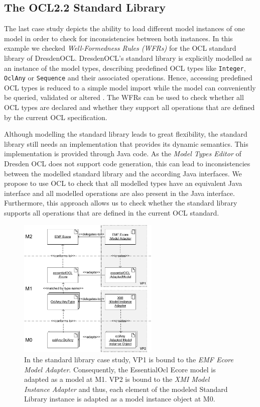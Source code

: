 \subsection{The OCL2.2 Standard Library}
The last case study depicts the ability to load different model instances of one model 
in order to check for inconsistencies between both instances. In this example we 
checked \textit{Well-Formedness Rules (WFRs)} for the OCL standard library of DresdenOCL. 
DresdenOCL's standard library is explicitly modelled as 
an instance of the model types, describing predefined OCL types like \texttt{Integer}, 
\texttt{OclAny} or \texttt{Sequence} and their associated operations. 
Hence, accessing predefined OCL types is reduced to a simple model 
import while the model can conveniently be queried, validated or altered 
\cite{braeuerOCL07}. The WFRs can be used to check whether all OCL types are 
declared and whether they support all operations that are defined by the 
current OCL specification.

Although modelling the standard library leads to great flexibility, the standard library 
still needs an implementation that provides its dynamic semantics. 
This implementation is provided through Java code. As the \textit{Model Types Editor} of Dresden OCL
does not support code generation, this can lead to inconsistencies between 
the modelled standard library and the according Java interfaces.
We propose to use OCL to check that all modelled types have an equivalent Java 
interface and all modelled operations are also present in the Java interface. Furthermore, 
this approach allows us to check whether the standard library supports all operations that 
are defined in the current OCL standard.

\begin{figure}[!t]
	\centering
		\includegraphics[width=0.60\textwidth]{figures/casestudy03.pdf}
	\caption{In the standard library case study, VP1 is bound to the \textit{EMF Ecore Model Adapter}. 
	  Consequently, the EssentialOcl Ecore model is adapted as a model at M1.
	  VP2 is bound to the \textit{XMI Model Instance Adapter} and thus, each element of the modeled Standard Library
	  instance is adapted as a model instance object at M0.}
	\label{fig:casestudy03}
\end{figure}

